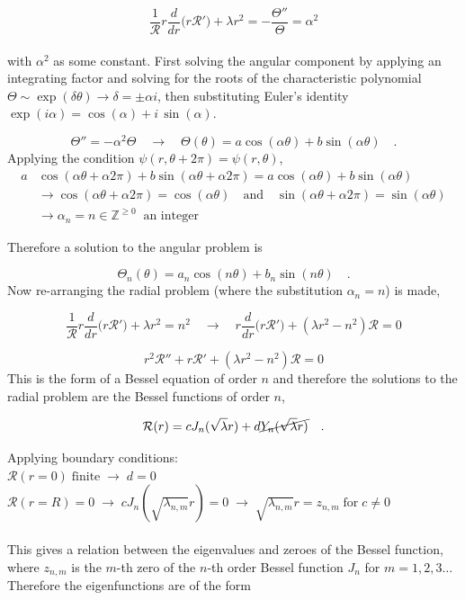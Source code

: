 \documentclass{homework}
\begin{document}
\[ \frac{1}{\mathcal{R}} r \frac{d}{dr} \big(r \mathcal{R'} \big) + \lambda r^2 = -\frac{\Theta''}{\Theta}  = \alpha^2 \]
\\ \noindent
with $\alpha^2$ as some constant. First solving the angular component by applying an integrating factor and solving for the roots of the characteristic polynomial $\Theta \sim \exp(\delta \theta) \rightarrow \delta = \pm \alpha i$, then substituting Euler's identity $\exp(i \alpha) = \cos(\alpha) + i \, \sin(\alpha)$. 

\[ \Theta'' = -\alpha^2 \Theta \quad \rightarrow \quad \Theta (\theta) = a \cos(\alpha \theta) + b \sin(\alpha \theta) \quad .\]
\noindent
Applying the condition $\psi(r, \theta + 2\pi) = \psi(r, \theta)$,
\begin{equation*}
    \begin{split}
        a &\cos(\alpha \theta + \alpha 2 \pi) + b \sin(\alpha \theta + \alpha 2 \pi) = a \cos(\alpha \theta) + b \sin(\alpha \theta) \\
        &\rightarrow  \cos(\alpha \theta + \alpha 2 \pi) = \cos(\alpha \theta) \quad \textrm{and} \quad \sin(\alpha \theta + \alpha 2 \pi) = \sin(\alpha \theta) \\
        &\rightarrow \alpha_n = n \in \mathbb{Z}^{\geq 0} \;\; \textrm{an integer}
    \end{split}
\end{equation*}

\noindent
Therefore a solution to the angular problem is

\[\Theta_n (\theta) = a_n \cos(n \theta) + b_n \sin(n \theta) \quad . \]
\newpage
\noindent
Now re-arranging the radial problem (where the substitution $\alpha_n = n$) is made,

\[ \frac{1}{\mathcal{R}} r \frac{d}{dr} \big(r \mathcal{R'} \big) + \lambda r^2 = n^2 \quad \rightarrow \quad r \frac{d}{dr} \big(r \mathcal{R'} \big) + (\lambda r^2 - n^2) \mathcal{R} = 0 \]

\[ r^2 \mathcal{R}'' + r \mathcal{R}' + (\lambda r^2 - n^2) \mathcal{R} = 0 \]
\noindent 
This is the form of a Bessel equation of order $n$ and therefore the solutions to the radial problem are the Bessel functions of order $n$,

\[\mathcal{R}(r) = c J_n (\sqrt{\lambda} r) + d \cancel{Y_n (\sqrt{\lambda} r)} \quad .\]

\noindent
Applying boundary conditions: \\
\noindent $\mathcal{R}(r = 0) \; \textrm{finite} \; \rightarrow \; d = 0$ \\
\noindent $\mathcal{R}(r = R) = 0 \; \rightarrow \; c J_n (\sqrt{\lambda_{n,m}} r) = 0 \; \rightarrow \; \sqrt{\lambda_{n,m}} r = z_{n,m} \; \textrm{for} \; c \neq 0$ \\ \\ \noindent
This gives a relation between the eigenvalues and zeroes of the Bessel function,  where $z_{n,m}$ is the $m$-th zero of the $n$-th order Bessel function $J_n$ for $m = 1,2,3 \dots$ Therefore the eigenfunctions  are of the form 
\end{document}
